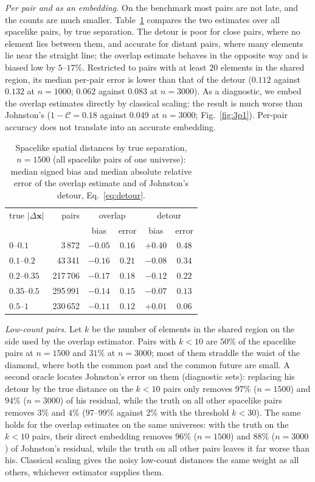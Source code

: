 \documentclass[prd,twocolumn,superscriptaddress,nofootinbib,amsmath,amssymb,floatfix]{revtex4-2}
\begin{document}
\emph{Per pair and as an embedding.} On the benchmark most pairs are not late, and the counts are much smaller. Table~\ref{tab:profile} compares the two estimates over all spacelike pairs, by true separation. The detour is poor for close pairs, where no element lies between them, and accurate for distant pairs, where many elements lie near the straight line; the overlap estimate behaves in the opposite way and is biased low by $5$--$17\%$. Restricted to pairs with at least $20$ elements in the shared region, its median per-pair error is lower than that of the detour ($0.112$ against $0.132$ at $n=1000$; $0.062$ against $0.083$ at $n=3000$). As a diagnostic, we embed the overlap estimates directly by classical scaling: the result is much worse than Johnston's ($1-\mathcal C=0.18$ against $0.049$ at $n=3000$; Fig.~\ref{fig:3p1}). Per-pair accuracy does not translate into an accurate embedding.

\begin{table}[t]
\caption{Spacelike spatial distances by true separation, $n=1500$ (all spacelike pairs of one universe): median signed bias and median absolute relative error of the overlap estimate and of Johnston's detour, Eq.~\eqref{eq:detour}.}
\label{tab:profile}
\begin{ruledtabular}
\begin{tabular}{lrcccc}
true $|\Delta\mathbf x|$ & pairs & \multicolumn{2}{c}{overlap} & \multicolumn{2}{c}{detour}\\
 & & bias & error & bias & error\\
\hline
$0$--$0.1$ & 3\,872 & $-0.05$ & $0.16$ & $+0.40$ & $0.48$\\
$0.1$--$0.2$ & 43\,341 & $-0.16$ & $0.21$ & $-0.08$ & $0.34$\\
$0.2$--$0.35$ & 217\,706 & $-0.17$ & $0.18$ & $-0.12$ & $0.22$\\
$0.35$--$0.5$ & 295\,991 & $-0.14$ & $0.15$ & $-0.07$ & $0.13$\\
$0.5$--$1$ & 230\,652 & $-0.11$ & $0.12$ & $+0.01$ & $0.06$\\
\end{tabular}
\end{ruledtabular}
\end{table}

\emph{Low-count pairs.} Let $k$ be the number of elements in the shared region on the side used by the overlap estimator. Pairs with $k<10$ are $50\%$ of the spacelike pairs at $n=1500$ and $31\%$ at $n=3000$; most of them straddle the waist of the diamond, where both the common past and the common future are small. A second oracle locates Johnston's error on them (diagnostic sets): replacing his detour by the true distance on the $k<10$ pairs only removes $97\%$ ($n=1500$) and $94\%$ ($n=3000$) of his residual, while the truth on all other spacelike pairs removes $3\%$ and $4\%$ ($97$--$99\%$ against $2\%$ with the threshold $k<30$). The same holds for the overlap estimates on the same universes: with the truth on the $k<10$ pairs, their direct embedding removes $96\%$ ($n=1500$) and $88\%$ ($n=3000$) of Johnston's residual, while the truth on all other pairs leaves it far worse than his. Classical scaling gives the noisy low-count distances the same weight as all others, whichever estimator supplies them.
\end{document}
